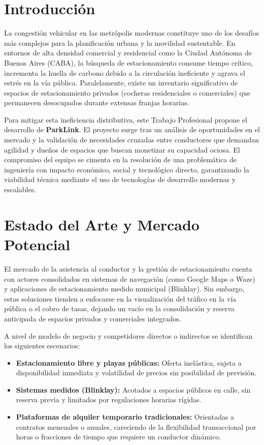 \documentclass[11pt, a4paper]{article}
\begin{document}
\section{Introducción}
La congestión vehicular en las metrópolis modernas constituye uno de los desafíos más complejos para la planificación urbana y la movilidad sustentable. En entornos de alta densidad comercial y residencial como la Ciudad Autónoma de Buenos Aires (CABA), la búsqueda de estacionamiento consume tiempo crítico, incrementa la huella de carbono debido a la circulación ineficiente y agrava el estrés en la vía pública. Paralelamente, existe un inventario significativo de espacios de estacionamiento privados (cocheras residenciales o comerciales) que permanecen desocupados durante extensas franjas horarias.

Para mitigar esta ineficiencia distributiva, este Trabajo Profesional propone el desarrollo de \textbf{ParkLink}. El proyecto surge tras un análisis de oportunidades en el mercado y la validación de necesidades cruzadas entre conductores que demandan agilidad y dueños de espacios que buscan monetizar su capacidad ociosa. El compromiso del equipo se cimenta en la resolución de una problemática de ingeniería con impacto económico, social y tecnológico directo, garantizando la viabilidad técnica mediante el uso de tecnologías de desarrollo modernas y escalables.


\section{Estado del Arte y Mercado Potencial}
El mercado de la asistencia al conductor y la gestión de estacionamiento cuenta con actores consolidados en sistemas de navegación (como Google Maps o Waze) y aplicaciones de estacionamiento medido municipal (Blinklay). Sin embargo, estas soluciones tienden a enfocarse en la visualización del tráfico en la vía pública o el cobro de tasas, dejando un vacío en la consolidación y reserva anticipada de espacios privados y comerciales integrados.

A nivel de modelo de negocio y competidores directos o indirectos se identifican los siguientes escenarios:
\begin{itemize}
    \item \textbf{Estacionamiento libre y playas públicas:} Oferta inelástica, sujeta a disponibilidad inmediata y volatilidad de precios sin posibilidad de previsión.
    \item \textbf{Sistemas medidos (Blinklay):} Acotados a espacios públicos en calle, sin reserva previa y limitados por regulaciones horarias rígidas.
    \item \textbf{Plataformas de alquiler temporario tradicionales:} Orientadas a contratos mensuales o anuales, careciendo de la flexibilidad transaccional por horas o fracciones de tiempo que requiere un conductor dinámico.
\end{itemize}
\end{document}

